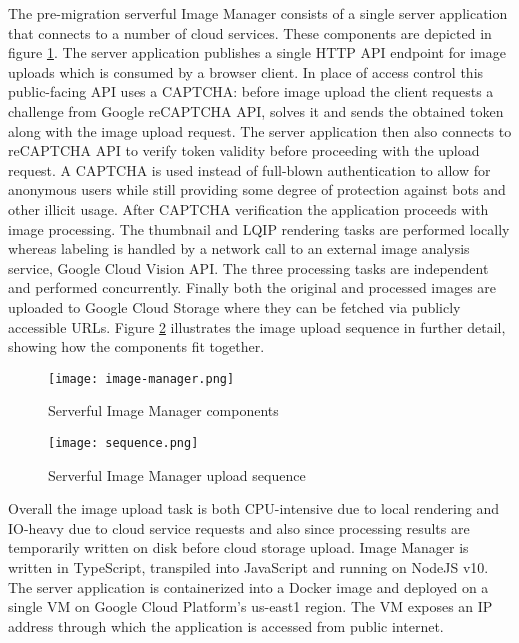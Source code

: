 The pre-migration serverful Image Manager consists of a single server application that connects to a number of cloud services. These components are depicted in figure \ref{fig:serverfulArchitecture}. The server application publishes a single HTTP API endpoint for image uploads which is consumed by a browser client. In place of access control this public-facing API uses a CAPTCHA: before image upload the client requests a challenge from Google reCAPTCHA API, solves it and sends the obtained token along with the image upload request. The server application then also connects to reCAPTCHA API to verify token validity before proceeding with the upload request. A CAPTCHA is used instead of full-blown authentication to allow for anonymous users while still providing some degree of protection against bots and other illicit usage. After CAPTCHA verification the application proceeds with image processing. The thumbnail and LQIP rendering tasks are performed locally whereas labeling is handled by a network call to an external image analysis service, Google Cloud Vision API. The three processing tasks are independent and performed concurrently. Finally both the original and processed images are uploaded to Google Cloud Storage where they can be fetched via publicly accessible URLs. Figure \ref{fig:serverfulSequence} illustrates the image upload sequence in further detail, showing how the components fit together.

\begin{figure}[h]
  \centering
  \texttt{[image: image-manager.png]}
  \caption{Serverful Image Manager components}
  \label{fig:serverfulArchitecture}
\end{figure}

\begin{figure}[h]
  \centering
  \texttt{[image: sequence.png]}
  \caption{Serverful Image Manager upload sequence}
  \label{fig:serverfulSequence}
\end{figure}

Overall the image upload task is both CPU-intensive due to local rendering and IO-heavy due to cloud service requests and also since processing results are temporarily written on disk before cloud storage upload. Image Manager is written in TypeScript, transpiled into JavaScript and running on NodeJS v10. The server application is containerized into a Docker image and deployed on a single VM on Google Cloud Platform's us-east1 region. The VM exposes an IP address through which the application is accessed from public internet.

